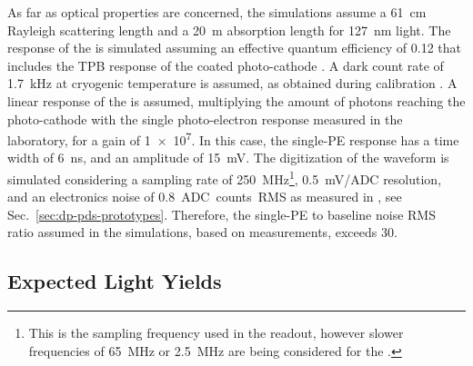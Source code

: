 As far as  optical properties are concerned, the simulations assume a \SI{61}{\cm} Rayleigh scattering length and a \SI{20}{\m} absorption length for \SI{127}{\nm} light. The response of the  is simulated assuming an effective quantum efficiency of \num{0.12} that includes the TPB response of the coated photo-cathode \cite{Bonesini:2018ubd}. A dark count rate of \SI{1.7}{\kilo\hertz} at cryogenic temperature is assumed, as obtained during   calibration \cite{Belver:2018erf}. A linear response of the  is assumed, multiplying the amount of photons reaching the photo-cathode with the single photo-electron response measured in the laboratory, for a gain of \num{1e7}. In this case, the single-PE response has a time width of \SI{6}{\nano\s}, and an amplitude of \SI{15}{mV}. The digitization of the waveform is simulated considering a sampling rate of \SI{250}{MHz}\footnote{This is the sampling frequency used in the  readout, however slower frequencies of \SI{65}{MHz} or \SI{2.5}{MHz} are being considered for the  .}, \SI{0.5}{mV/ADC} resolution, and an electronics noise of \SI{0.8}{ADC counts RMS} as measured in , see Sec.~\ref{sec:dp-pds-prototypes}. Therefore, the single-PE to baseline noise RMS ratio assumed in the simulations, based on  measurements, exceeds \num{30}. 


\subsection{Expected Light Yields}
\label{subsec:dp-pds-simulation_yields}



